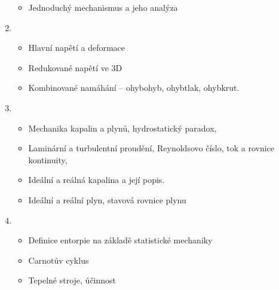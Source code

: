 \documentclass[letterpaper,10pt,english]{jupyterBook}
\begin{document}
\begin{enumerate}
\begin{itemize}
\item {} 
\sphinxAtStartPar
Jednoduchý mechanismus a jeho analýza

\end{itemize}

\item {} 
\sphinxAtStartPar
{}
\begin{itemize}
\item {} 
\sphinxAtStartPar
Hlavní napětí a deformace

\item {} 
\sphinxAtStartPar
Redukované napětí ve 3D

\item {} 
\sphinxAtStartPar
Kombinované namáhání – ohyb\sphinxhyphen{}ohyb, ohyb\sphinxhyphen{}tlak, ohyb\sphinxhyphen{}krut.

\end{itemize}

\item {} 
\sphinxAtStartPar
{}
\begin{itemize}
\item {} 
\sphinxAtStartPar
Mechanika kapalin a plynů, hydrostatický paradox,

\item {} 
\sphinxAtStartPar
Laminární a turbulentní proudění, Reynoldsovo číslo, tok a rovnice kontinuity,

\item {} 
\sphinxAtStartPar
Ideální a reálná kapalina a její popis.

\item {} 
\sphinxAtStartPar
Ideální a reální plyn, stavová rovnice plynu

\end{itemize}

\item {} 
\sphinxAtStartPar
{}
\begin{itemize}
\item {} 
\sphinxAtStartPar
Definice entorpie na základě statistické mechaniky

\item {} 
\sphinxAtStartPar
Carnotův cyklus

\item {} 
\sphinxAtStartPar
Tepelné stroje, účinnost

\end{itemize}

\end{enumerate}
\end{document}
